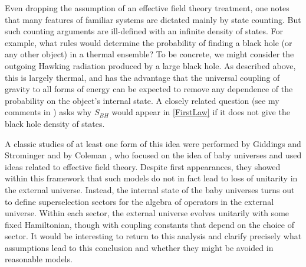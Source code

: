 \documentclass[12pt]{article}
\begin{document}
Even dropping the assumption of an effective field theory treatment, one notes that many features of familiar systems are dictated mainly by state counting.  But such counting arguments are ill-defined with an infinite density of states. For example, what rules would determine the probability of finding a black hole (or any other object) in a thermal ensemble?  To be concrete, we might consider the outgoing Hawking radiation produced by a large black hole.  As described above, this is largely thermal, and has the advantage that the universal coupling of gravity to all forms of energy can be expected to remove any dependence of the probability on the object's internal state.  A closely related question (see my comments in \cite{Jacobson:2005kr}) asks why $S_{BH}$ would appear in \eqref{FirstLaw} if it does not give the black hole density of states.

A classic studies of at least one form of this idea were performed by Giddings and Strominger \cite{Giddings:1988cx} and by Coleman \cite{Coleman:1988cy}, who focused on the idea of baby universes and used ideas related to effective field theory.  Despite first appearances, they showed  within this framework that such models do not in fact lead to loss of unitarity in the external universe.  Instead, the internal state of the baby universes turns out to define superselection sectors for the algebra of operators in the external universe.  Within each sector,  the external universe evolves unitarily with some fixed Hamiltonian, though with coupling constants that depend on the choice of sector.  It would be interesting to return to this analysis and clarify precisely what assumptions lead to this conclusion and whether they might be avoided in reasonable models.
\end{document}
